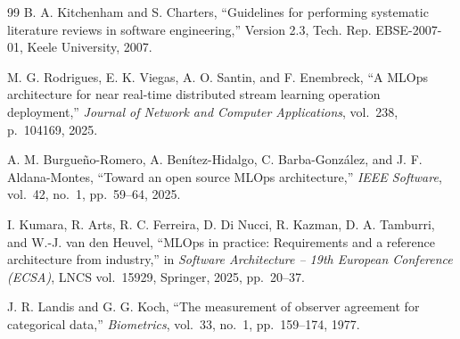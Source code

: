 \documentclass[11pt,a4paper]{article}
\begin{document}
\begin{thebibliography}{99}
 B. A. Kitchenham and S. Charters, ``Guidelines for performing systematic literature reviews in software engineering,'' Version 2.3, Tech. Rep. EBSE-2007-01, Keele University, 2007.

 M. G. Rodrigues, E. K. Viegas, A. O. Santin, and F. Enembreck, ``A MLOps architecture for near real-time distributed stream learning operation deployment,'' \emph{Journal of Network and Computer Applications}, vol.~238, p.~104169, 2025.

 A. M. Burgue\~no-Romero, A. Ben\'itez-Hidalgo, C. Barba-Gonz\'alez, and J. F. Aldana-Montes, ``Toward an open source MLOps architecture,'' \emph{IEEE Software}, vol.~42, no.~1, pp.~59--64, 2025.

 I. Kumara, R. Arts, R. C. Ferreira, D. Di Nucci, R. Kazman, D. A. Tamburri, and W.-J. van den Heuvel, ``MLOps in practice: Requirements and a reference architecture from industry,'' in \emph{Software Architecture -- 19th European Conference (ECSA)}, LNCS vol.~15929, Springer, 2025, pp.~20--37.

 J. R. Landis and G. G. Koch, ``The measurement of observer agreement for categorical data,'' \emph{Biometrics}, vol.~33, no.~1, pp.~159--174, 1977.

\end{thebibliography}
\end{document}
